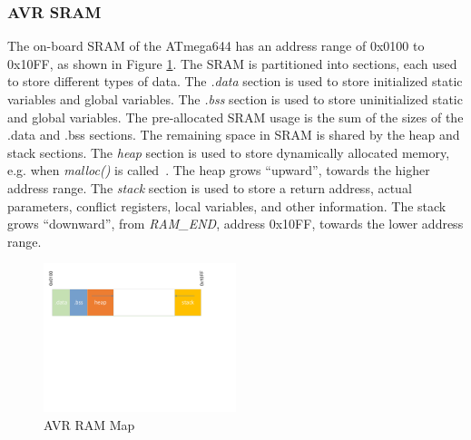 \subsubsection{AVR SRAM}
\vspace{-5pt}
The on-board SRAM of the ATmega644 has an address range of 0x0100 to 0x10FF, as shown in Figure \ref{fig:ram_map}. The SRAM is partitioned into sections, each used to store different types of data. The \textit{.data} section is used to store initialized static variables and global variables. The \textit{.bss} section is used to store uninitialized static and global variables. The pre-allocated SRAM usage is the sum of the sizes of the .data and .bss sections. The remaining space in SRAM is shared by the heap and stack sections. The \textit{heap} section is used to store dynamically allocated memory, e.g. when \textit{malloc()} is called~\cite{goldt1995linux}. The heap grows ``upward'', towards the higher address range. The \textit{stack} section is used to store a return address, actual parameters, conflict registers, local variables, and other information. The stack grows ``downward'', from \textit{RAM\_END}, address 0x10FF, towards the lower address range.
\begin{figure}
\centering
\includegraphics[width=0.5\textwidth]{figures/Memory_model.pdf}
\vspace{-15pt}
\caption{AVR RAM Map}
\vspace{-5pt}
\label{fig:ram_map}
\end{figure}

\vspace{-15pt}

